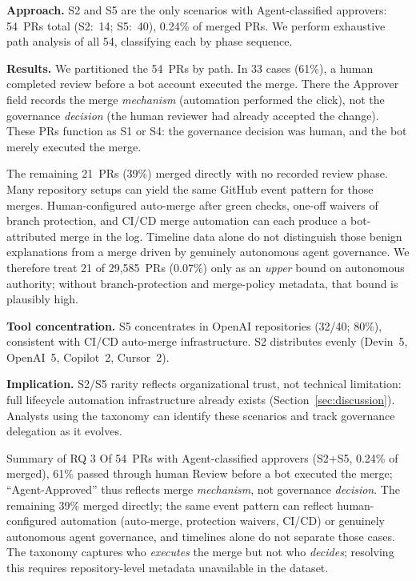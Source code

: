 \documentclass[sigconf]{acmart}
\begin{document}
\textbf{Approach.} S2 and S5 are the only scenarios with
Agent-classified approvers: 54~PRs total (S2:~14; S5:~40),
0.24\% of merged PRs.
We perform exhaustive path analysis of all 54, classifying each
by phase sequence.

\textbf{Results.}
We partitioned the 54~PRs by path.
In 33 cases (61\%), a human completed review before a bot account
executed the merge.
There the Approver field records the merge \emph{mechanism}
(automation performed the click), not the governance
\emph{decision} (the human reviewer had already accepted the
change).
These PRs function as S1 or S4: the governance decision was human,
and the bot merely executed the merge.

The remaining 21~PRs (39\%) merged directly with no recorded
review phase.
Many repository setups can yield the same GitHub event pattern for
those merges.
Human-configured auto-merge after green checks, one-off waivers of
branch protection, and CI/CD merge automation can each produce a
bot-attributed merge in the log.
Timeline data alone do not distinguish those benign explanations from a
merge driven by genuinely autonomous agent governance.
We therefore treat 21 of 29,585~PRs (0.07\%) only as an \emph{upper}
bound on autonomous authority; without branch-protection and
merge-policy metadata, that bound is plausibly high.

\noindent\textbf{Tool concentration.}
S5 concentrates in OpenAI repositories (32/40; 80\%),
consistent with CI/CD auto-merge infrastructure.
S2 distributes evenly (Devin~5, OpenAI~5, Copilot~2, Cursor~2).

\noindent\textbf{Implication.}
S2/S5 rarity reflects organizational trust, not technical
limitation: full lifecycle automation infrastructure already
exists (Section~\ref{sec:discussion}).
Analysts using the taxonomy can identify these scenarios and
track governance delegation as it evolves.

\begin{rqsummary}{Summary of RQ 3}
Of 54~PRs with Agent-classified approvers (S2+S5, 0.24\% of merged),
61\% passed through human Review before a bot executed the merge;
``Agent-Approved'' thus reflects merge \emph{mechanism}, not governance
\emph{decision}.
The remaining 39\% merged directly; the same event pattern can
reflect human-configured automation (auto-merge, protection
waivers, CI/CD) or genuinely autonomous agent governance, and
timelines alone do not separate those cases.
The taxonomy captures who \emph{executes} the merge but not who
\emph{decides}; resolving this requires repository-level metadata
unavailable in the dataset.
\end{rqsummary}
\end{document}
